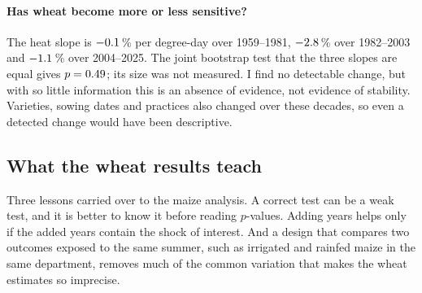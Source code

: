 \paragraph{Has wheat become more or less sensitive?} The heat slope is $-0.1$\,\% per degree-day over 1959--1981, $-2.8$\,\% over 1982--2003 and $-1.1$\,\% over 2004--2025. The joint bootstrap test that the three slopes are equal gives $p = 0.49$; its size was not measured. I find no detectable change, but with so little information this is an absence of evidence, not evidence of stability. Varieties, sowing dates and practices also changed over these decades, so even a detected change would have been descriptive.

\subsection{What the wheat results teach}

Three lessons carried over to the maize analysis. A correct test can be a weak test, and it is better to know it before reading $p$-values. Adding years helps only if the added years contain the shock of interest. And a design that compares two outcomes exposed to the same summer, such as irrigated and rainfed maize in the same department, removes much of the common variation that makes the wheat estimates so imprecise.
